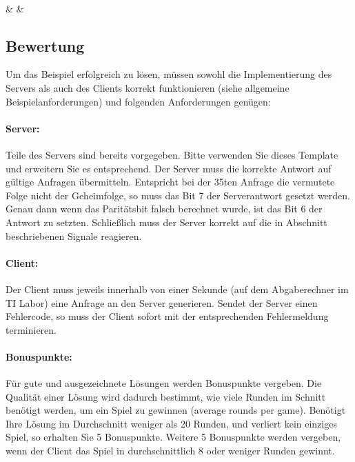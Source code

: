\documentclass{article}
\begin{document}
\begin{bytefield}[boxformatting={\centering\itshape},bitwidth=2.2em]{8}
    \\
    &  & 
\end{bytefield}


\subsection*{Bewertung}
\label{sec:grading}
Um das Beispiel erfolgreich zu lösen, müssen sowohl die Implementierung des
Servers als auch des Clients korrekt funktionieren (siehe allgemeine Beispielanforderungen) und folgenden Anforderungen genügen:

\paragraph{Server:}
Teile des Servers sind bereits vorgegeben. Bitte verwenden Sie dieses Template und erweitern Sie es entsprechend.
Der Server muss die korrekte Antwort auf gültige Anfragen
übermitteln. Entspricht bei der 35ten Anfrage die vermutete Folge nicht der
Geheimfolge, so muss das Bit 7 der Serverantwort gesetzt werden. Genau dann
wenn das Paritätsbit falsch berechnet wurde, ist das Bit 6 der Antwort zu
setzten. Schließlich muss der Server korrekt auf die in Abschnitt
 beschriebenen Signale reagieren.

\paragraph{Client:} Der Client muss jeweils innerhalb von einer Sekunde (auf
dem Abgaberechner im TI Labor) eine Anfrage an den Server generieren. 
Sendet der Server einen Fehlercode, so muss der Client sofort mit der
entsprechenden Fehlermeldung terminieren.

\paragraph{Bonuspunkte:} Für gute und ausgezeichnete L\"osungen werden Bonuspunkte vergeben.
Die Qualität einer Lösung wird dadurch bestimmt, wie viele Runden im Schnitt
benötigt werden, um ein Spiel zu gewinnen (average rounds per game). 
Ben\"otigt Ihre L\"osung im Durchschnitt weniger als 20 Runden, und verliert kein
einziges Spiel, so erhalten Sie 5 Bonuspunkte. Weitere 5 Bonuspunkte werden vergeben,
wenn der Client das Spiel in durchschnittlich 8 oder weniger Runden gewinnt.
\end{document}
